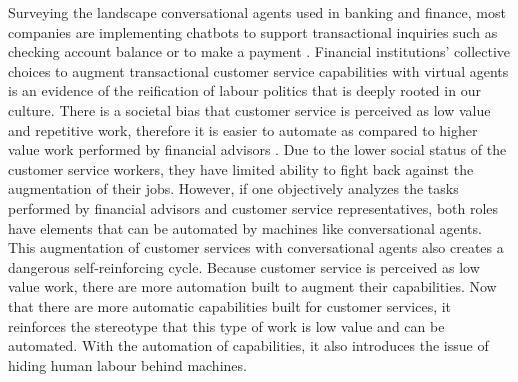 \documentclass{sigchi-ext}
\begin{document}
Surveying the landscape conversational agents used in banking and finance, most companies are implementing chatbots to support transactional inquiries such as checking account balance or to make a payment \cite{chatbotguide}. Financial institutions' collective choices to augment transactional customer service capabilities with virtual agents is an evidence of the reification of labour politics that is deeply rooted in our culture. There is a societal bias that customer service is perceived as low value and repetitive work, therefore it is easier to automate as compared to higher value work performed by financial advisors \cite{dhaliwal2022cyber}. Due to the lower social status of the customer service workers, they have limited ability to fight back against the augmentation of their jobs. However, if one objectively analyzes the tasks performed by financial advisors and customer service representatives, both roles have elements that can be automated by machines like conversational agents. This augmentation of customer services with conversational agents also creates a dangerous self-reinforcing cycle. Because customer service is perceived as low value work, there are more automation built to augment their capabilities. Now that there are more automatic capabilities built for customer services, it reinforces the stereotype that this type of work is low value and can be automated. With the automation of capabilities, it also introduces the issue of hiding human labour behind machines.
\end{document}
